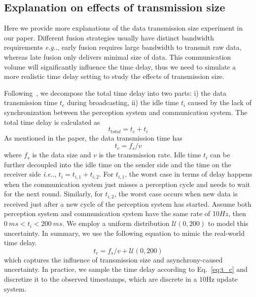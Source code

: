 \documentclass[runningheads]{llncs}
\makeatletter
\DeclareRobustCommand\onedot{\futurelet\@let@token\@onedot}
\def\@onedot{\ifx\@let@token.\else.\null\fi\xspace}
\def\eg{\emph{e.g}\onedot} \def\Eg{\emph{E.g}\onedot}
\def\ie{\emph{i.e}\onedot} \def\Ie{\emph{I.e}\onedot}
\makeatother
\begin{document}
\subsection{Explanation on effects of transmission size}
 Here we provide more explanations of the data transmission size experiment in our paper. Different fusion strategies usually have distinct bandwidth requirements \eg, early fusion requires large bandwidth to transmit raw data, whereas late fusion only delivers minimal size of data. This communication volume will significantly influence the time delay, thus we need to simulate a more realistic time delay setting to study the effects of transmission size.

Following~\cite{rauch2011analysis}, we decompose the total time delay into two parts: i) the data transmission time $t_c$ during broadcasting, ii) the idle time $t_{i}$ caused by the lack of synchronization between the perception system and communication system. The total time delay is calculated as 
\begin{equation}
    t_{total} = t_c + t_i
\end{equation}
As mentioned in the paper, the data transmission time has
\begin{equation}
    t_c=f_s/v
    \label{eq:t_c}
\end{equation}
where $f_s$ is the data size and $v$ is the transmission rate. Idle time $t_i$ can be further decoupled into the idle time on the sender side and the time on the receiver side \ie, $t_i=t_{i,1}+t_{i,2}$.
 For $t_{i, 1}$,  the worst case in terms of delay happens when the communication system just misses a perception cycle and needs to wait for the next round. Similarly,  for  $t_{i, 2}$,  the worst case occurs when new data is received just after a
new cycle of the perception system has started. Assume both perception system and communication system have the same rate of 10$Hz$, then $0~ms< t_i < 200~ms$. We employ a uniform distribution $\mathcal{U}\left(0,200\right)$ to model this uncertainty. In summary, we use the following equation to mimic the real-world time delay. 
\begin{equation}
    t_c=f_s/v+\mathcal{U}\left(0,200\right)
\end{equation}
which captures the influence of transmission size and asynchrony-caused uncertainty. In practice, we sample the time delay according to Eq.~\ref{eq:t_c} and discretize it to the observed timestamps, which are discrete in a 10Hz update system. 
\end{document}
